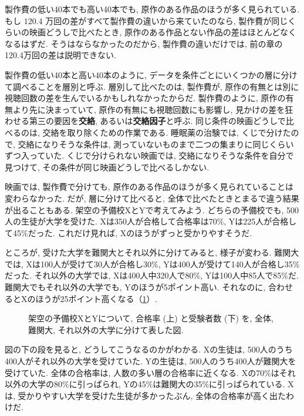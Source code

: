     製作費の低い40本でも高い40本でも, 原作のある作品のほうが多く見られている.
    もし $120.4$ 万回の差がすべて製作費の違いから来ていたのなら, 製作費が同じくらいの映画どうしで比べたとき, 原作のある作品とない作品の差はほとんどなくなるはずだ.
    そうはならなかったのだから, 製作費の違いだけでは, 前の章の120.4万回の差は説明できない.

    製作費の低い40本と高い40本のように, データを条件ごとにいくつかの層に分けて調べることを層別と呼ぶ.
    層別して比べたのは, 製作費が, 原作の有無とは別に視聴回数の差を生んでいるかもしれなかったからだ.
    製作費のように, 原作の有無より先に決まっていて, 原作の有無にも視聴回数にも影響し, 見かけの差を狂わせる第三の要因を\textbf{交絡}, あるいは\textbf{交絡因子}と呼ぶ.
    同じ条件の映画どうしで比べるのは, 交絡を取り除くための作業である.
    睡眠薬の治験では, くじで分けたので, 交絡になりそうな条件は, 測っていないものまで二つの集まりに同じくらいずつ入っていた.
    くじで分けられない映画では, 交絡になりそうな条件を自分で見つけて, その条件が同じ映画どうしで比べるしかない.

    映画では, 製作費で分けても, 原作のある作品のほうが多く見られていることは変わらなかった.
    だが, 層に分けて比べると, 全体で比べたときとまるで違う結果が出ることもある.
    架空の予備校XとYで考えてみよう.
    どちらの予備校でも, 500人の生徒が大学を受けた.
    Xは350人が合格して合格率は70\%, Yは225人が合格して45\%だった.
    これだけ見れば, Xのほうがずっと受かりやすそうだ.

    ところが, 受けた大学を難関大とそれ以外に分けてみると, 様子が変わる.
    難関大では, Xは100人が受けて30人が合格し30\%, Yは400人が受けて140人が合格し35\%だった.
    それ以外の大学では, Xは400人中320人で80\%, Yは100人中85人で85\%だ.
    難関大でもそれ以外の大学でも, Yのほうが5ポイント高い.
    それなのに, 合わせるとXのほうが25ポイント高くなる（\cref{fig:ch06-juku}）.

    \begin{figure}[htbp]
      \centering
      
      \caption{架空の予備校XとYについて, 合格率 (上) と受験者数 (下) を, 全体, 難関大, それ以外の大学に分けて表した図.}
      \label{fig:ch06-juku}
    \end{figure}

    図の下の段を見ると, どうしてこうなるのかがわかる.
    Xの生徒は, 500人のうち400人がそれ以外の大学を受けていた.
    Yの生徒は, 500人のうち400人が難関大を受けていた.
    全体の合格率は, 人数の多い層の合格率に近くなる.
    Xの70\%はそれ以外の大学の80\%に引っぱられ, Yの45\%は難関大の35\%に引っぱられている.
    Xは, 受かりやすい大学を受けた生徒が多かったぶん, 全体の合格率が高く出たわけだ.

